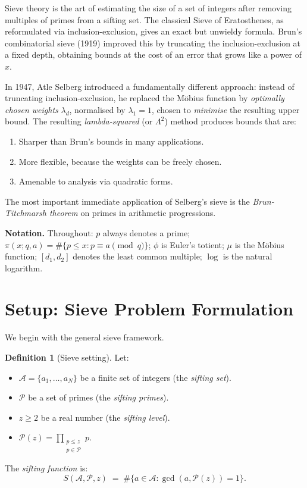 \documentclass[12pt,a4paper]{amsart}
\theoremstyle{definition}
\newtheorem{definition}[theorem]{Definition}
\begin{document}
Sieve theory is the art of estimating the size of a set of integers after
removing multiples of primes from a sifting set.  The classical Sieve of
Eratosthenes, as reformulated via inclusion-exclusion, gives an exact but
unwieldy formula.  Brun's combinatorial sieve (1919) improved this by
truncating the inclusion-exclusion at a fixed depth, obtaining bounds at
the cost of an error that grows like a power of $x$.

In 1947, Atle Selberg introduced a fundamentally different approach: instead
of truncating inclusion-exclusion, he replaced the M\"obius function by
\emph{optimally chosen weights} $\lambda_d$, normalised by $\lambda_1 = 1$,
chosen to \emph{minimise} the resulting upper bound.  The resulting
\emph{lambda-squared} (or $\Lambda^2$) method produces bounds that are:
\begin{enumerate}
  \item Sharper than Brun's bounds in many applications.
  \item More flexible, because the weights can be freely chosen.
  \item Amenable to analysis via quadratic forms.
\end{enumerate}

The most important immediate application of Selberg's sieve is the
\emph{Brun-Titchmarsh theorem} on primes in arithmetic progressions.

\textbf{Notation.}
Throughout: $p$ always denotes a prime; $\pi(x; q, a) = \#\{p \leq x : p \equiv a \pmod q\}$;
$\phi$ is Euler's totient; $\mu$ is the M\"obius function; $[d_1, d_2]$
denotes the least common multiple; $\log$ is the natural logarithm.

\section{Setup: Sieve Problem Formulation}
\label{sec:setup}

We begin with the general sieve framework.

\begin{definition}[Sieve setting]\label{def:sieve}
  Let:
  \begin{itemize}
    \item $\mathcal{A} = \{a_1, \ldots, a_N\}$ be a finite set of integers
      (the \emph{sifting set}).
    \item $\mathcal{P}$ be a set of primes (the \emph{sifting primes}).
    \item $z \geq 2$ be a real number (the \emph{sifting level}).
    \item $\mathcal{P}(z) = \prod_{\substack{p \leq z \\ p \in \mathcal{P}}} p$.
  \end{itemize}
  The \emph{sifting function} is:
  \[
    S(\mathcal{A}, \mathcal{P}, z)
    \;=\; \#\{a \in \mathcal{A} : \gcd(a, \mathcal{P}(z)) = 1\}.
  \]
\end{definition}
\end{document}
